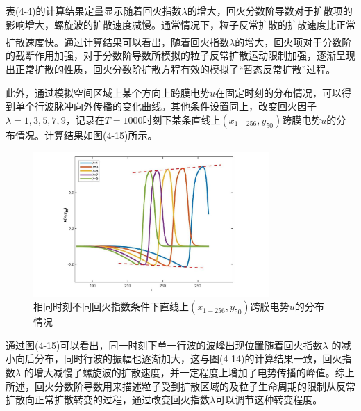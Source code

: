 \documentclass[twoside,UTF8]{nputhesis}
\newcommand{\upcite}[1]{\textsuperscript{\textsuperscript{\cite{#1}}}}
\begin{document}
表(4-4)的计算结果定量显示随着回火指数$\lambda $的增大，回火分数阶导数对于扩散项的影响增大，螺旋波的扩散速度减慢。通常情况下，粒子反常扩散的扩散速度比正常扩散速度快\upcite{sabzikar2015tempered}。通过计算结果可以看出，随着回火指数$\lambda $的增大，回火项对于分数阶的截断作用加强，对于分数阶导数所模拟的粒子反常扩散运动限制加强，逐渐呈现出正常扩散的性质，回火分数阶扩散方程有效的模拟了“暂态反常扩散”过程。

此外，通过模拟空间区域上某个方向上跨膜电势$u$在固定时刻的分布情况，可以得到单个行波脉冲向外传播的变化曲线。其他条件设置同上，改变回火因子$\lambda =1,3,5,7,9$，记录在$T=1000$时刻下某条直线上$({{x}_{1-256}},{{y}_{50}})$跨膜电势$u$的分布情况。计算结果如图(4-15)所示。
\begin{figure}[htb]
	\centering
	\includegraphics[width=0.8\textwidth,height=0.4\textwidth]{figures/hangwave.jpg}
	\hspace{0.04\textwidth}
	\setlength{\abovecaptionskip}{0.cm}
	\caption{相同时刻不同回火指数条件下直线上$({{x}_{1-256}},{{y}_{50}})$跨膜电势$u$的分布情况}
	\setlength{\belowcaptionskip}{-0.2cm}	
	\label{FCR} 
\end{figure}

通过图(4-15)可以看出，同一时刻下单一行波的波峰出现位置随着回火指数$\lambda $ 的减小向后分布，同时行波的振幅也逐渐加大，这与图(4-14)的计算结果一致，回火指数$\lambda $ 的增大减慢了螺旋波的扩散速度，并一定程度上增加了电势传播的峰值。综上所述，回火分数阶导数用来描述粒子受到扩散区域的及粒子生命周期的限制从反常扩散向正常扩散转变的过程，通过改变回火指数$\lambda $可以调节这种转变程度。\\
\noindent   %
\end{document}
